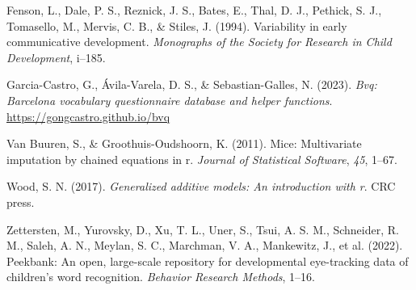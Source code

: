 \documentclass[
  letterpaper,
  DIV=11,
  numbers=noendperiod]{scrartcl}
\newlength{\cslhangindent}
\newlength{\cslentryspacingunit} %
\newenvironment{CSLReferences}[2] %
 {%
  \setlength{\parindent}{0pt}
  \ifodd #1
  \let\oldpar\par
  \def\par{\hangindent=\cslhangindent\oldpar}
  \fi
  \setlength{\parskip}{#2\cslentryspacingunit}
 }%
 {}
\begin{document}
\begin{CSLReferences}{1}{0}
\leavevmode{}%
Fenson, L., Dale, P. S., Reznick, J. S., Bates, E., Thal, D. J.,
Pethick, S. J., Tomasello, M., Mervis, C. B., \& Stiles, J. (1994).
Variability in early communicative development. \emph{Monographs of the
Society for Research in Child Development}, i--185.

\leavevmode{}%
Garcia-Castro, G., Ávila-Varela, D. S., \& Sebastian-Galles, N. (2023).
\emph{Bvq: Barcelona vocabulary questionnaire database and helper
functions}. \url{https://gongcastro.github.io/bvq}

\leavevmode{}%
Van Buuren, S., \& Groothuis-Oudshoorn, K. (2011). Mice: Multivariate
imputation by chained equations in r. \emph{Journal of Statistical
Software}, \emph{45}, 1--67.

\leavevmode{}%
Wood, S. N. (2017). \emph{Generalized additive models: An introduction
with r}. CRC press.

\leavevmode{}%
Zettersten, M., Yurovsky, D., Xu, T. L., Uner, S., Tsui, A. S. M.,
Schneider, R. M., Saleh, A. N., Meylan, S. C., Marchman, V. A.,
Mankewitz, J., et al. (2022). Peekbank: An open, large-scale repository
for developmental eye-tracking data of children's word recognition.
\emph{Behavior Research Methods}, 1--16.

\end{CSLReferences}
\end{document}
